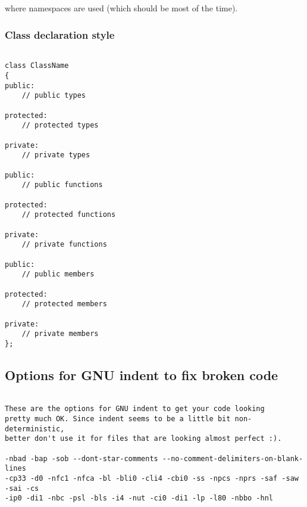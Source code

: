 where namespaces are used (which should be most of the time).

\subsubsection{Class declaration style}
\begin{verbatim}

class ClassName
{
public:
	// public types

protected:
	// protected types

private:
	// private types
	
public:
	// public functions

protected:
	// protected functions

private:
	// private functions

public:
	// public members

protected:
	// protected members

private:
	// private members
};

\end{verbatim}
\subsection{Options for GNU indent to fix broken code}
\begin{verbatim}

These are the options for GNU indent to get your code looking
pretty much OK. Since indent seems to be a little bit non-deterministic, 
better don't use it for files that are looking almost perfect :). 

-nbad -bap -sob --dont-star-comments --no-comment-delimiters-on-blank-lines
-cp33 -d0 -nfc1 -nfca -bl -bli0 -cli4 -cbi0 -ss -npcs -nprs -saf -saw -sai -cs
-ip0 -di1 -nbc -psl -bls -i4 -nut -ci0 -di1 -lp -l80 -nbbo -hnl

\end{verbatim}

